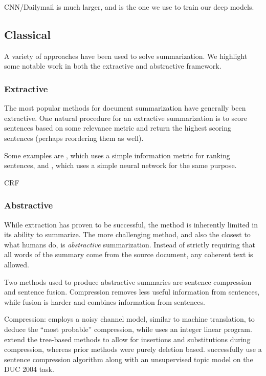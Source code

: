 \documentclass[11pt]{report}
\begin{document}
CNN/Dailymail is much larger, and is the one we use to train our deep models.

\subsection{Classical}

A variety of approaches have been used to solve summarization. We highlight some notable work in both the extractive and abstractive framework.

\subsubsection{Extractive}

The most popular methods for document summarization have generally been extractive. One natural procedure for an extractive summarization is to score sentences based on some relevance metric and return the highest scoring sentences (perhaps reordering them as well).

Some examples are \cite{carbonell1998MMR}, which uses a simple information metric for ranking sentences, and \cite{svore2007}, which uses a simple neural network for the same purpose.

CRF \cite{Shen2004}



\subsubsection{Abstractive}

While extraction has proven to be successful, the method is inherently limited in its ability to summarize. The more challenging method, and also the closest to what humans do, is \emph{abstractive} summarization. Instead of strictly requiring that all words of the summary come from the source document, any coherent text is allowed.

Two methods used to produce abstractive summaries are sentence compression and sentence fusion. Compression removes less useful information from sentences, while fusion is harder and combines information from sentences. %

Compression: \cite{knight2002summarization} employs a noisy channel model, similar to machine translation, to deduce the ``most probable'' compression, while \cite{clarke2008global} uses an integer linear program. \cite{cohn2008sentence} extend the tree-based methods to allow for insertions and substitutions during compression, whereas prior methods were purely deletion based. \cite{zajic2004topiary} successfully use a sentence compression algorithm along with an unsupervised topic model on the DUC 2004 task.
\end{document}

